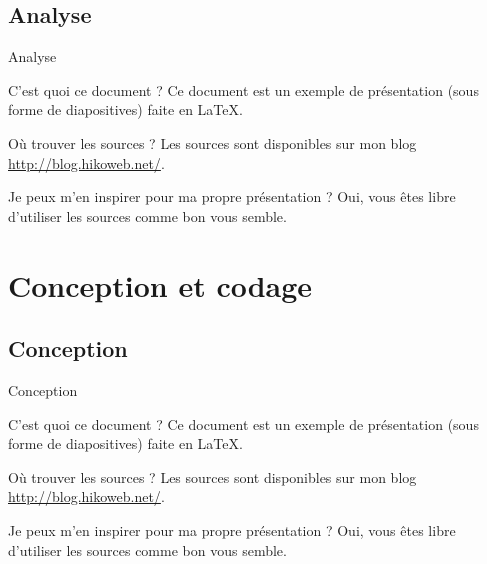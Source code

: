 \documentclass[utf8,compress]{beamer}
\begin{document}
\subsection{Analyse}
\begin{frame}{Analyse}
\begin{block}{C'est quoi ce document ?}
    Ce document est un exemple de présentation (sous forme de diapositives) faite en LaTeX.
\end{block}
\begin{block}{Où trouver les sources ?}
    Les sources sont disponibles sur mon blog \url{http://blog.hikoweb.net/}.
\end{block}
\begin{block}{Je peux m'en inspirer pour ma propre présentation ?}
    Oui, vous êtes libre d'utiliser les sources comme bon vous semble.
\end{block}
\end{frame}

\section{Conception et codage}
\subsection{Conception}
\begin{frame}{Conception}
\begin{block}{C'est quoi ce document ?}
    Ce document est un exemple de présentation (sous forme de diapositives) faite en LaTeX.
\end{block}
\begin{block}{Où trouver les sources ?}
    Les sources sont disponibles sur mon blog \url{http://blog.hikoweb.net/}.
\end{block}
\begin{block}{Je peux m'en inspirer pour ma propre présentation ?}
    Oui, vous êtes libre d'utiliser les sources comme bon vous semble.
\end{block}
\end{frame}
\end{document}
